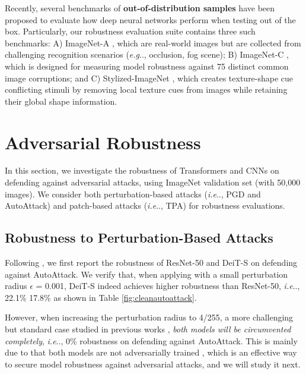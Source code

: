 \documentclass{article}
\makeatletter
\def\vs{{\bm{s}}}
\DeclareRobustCommand\onedot{\futurelet\@let@token\@onedot}
\def\@onedot{\ifx\@let@token.\else.\null\fi\xspace}
\def\eg{\emph{e.g}\onedot} \def\Eg{\emph{E.g}\onedot}
\def\ie{\emph{i.e}\onedot} \def\Ie{\emph{I.e}\onedot}
\makeatother
\begin{document}
Recently, several benchmarks of \textbf{out-of-distribution samples} have been proposed to  evaluate how deep neural networks perform when testing out of the box. Particularly, our robustness evaluation suite contains three such benchmarks: A) ImageNet-A \cite{hendrycks2021nae}, which are real-world images but are collected from challenging recognition scenarios (\eg, occlusion, fog scene); B) ImageNet-C \cite{Hendrycks2018}, which is designed for measuring model robustness against 75 distinct common image corruptions; and C) Stylized-ImageNet \cite{Geirhos2018}, which creates texture-shape cue conflicting stimuli by removing local texture cues from images while retaining their global shape information.



\section{Adversarial Robustness}
\label{sec:adv_robustness}
In this section, we investigate the robustness of Transformers and CNNs on defending against adversarial attacks, using ImageNet validation set (with 50,000 images). We consider both perturbation-based attacks (\ie, PGD and AutoAttack) and patch-based attacks (\ie, TPA) for robustness evaluations.

\subsection{Robustness to Perturbation-Based Attacks}
Following \cite{shao2021adversarial}, we first report the robustness of ResNet-50 and DeiT-S on defending against AutoAttack. We verify that, when applying with a small perturbation radius $\epsilon$ = 0.001, DeiT-S indeed achieves higher robustness than ResNet-50, \ie, 22.1\% \vs 17.8\% as shown in Table \ref{fig:cleanautoattack}.

However, when increasing the perturbation radius to 4/255, a more challenging but standard case studied in previous works \cite{ali2019free_adv_train,wong2020fast,xie2020smooth}, \emph{both models will be circumvented completely}, \ie, 0\% robustness on defending against AutoAttack. This is mainly due to that both models are not adversarially trained \cite{Goodfellow2015,Madry2018}, which is an effective way to secure model robustness against adversarial attacks, and we will study it next.
\end{document}
